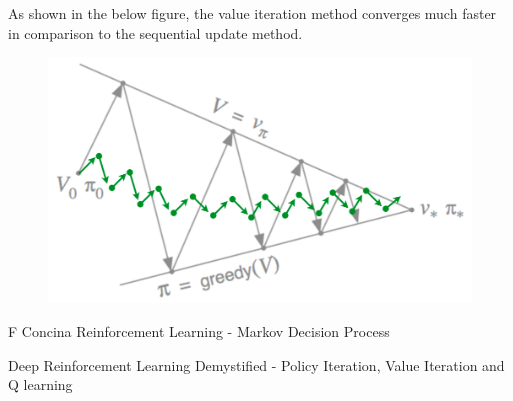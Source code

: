 \documentclass[11pt]{article}
\begin{document}
As shown in the below figure, the value iteration method converges much faster in comparison to the sequential update method.
\begin{figure}[H]
    \centering
    \includegraphics[scale=0.4]{images/value_iteration.png}
    
\end{figure}




{


\begin{thebibliography}{9}
    
    F Concina Reinforcement Learning - Markov Decision Process\\
    [\textit{[Markov Decision Process](https://fabioconcina.github.io/blog/markov-decision-process)}]
    
    Deep Reinforcement Learning Demystified - Policy Iteration, Value Iteration and Q learning\\
    [\textit{https://medium.com/@m.alzantot/deep-reinforcement-learning-demysitifed-episode-2-policy-iteration-value-iteration-and-q-978f9e89ddaa}]
\end{thebibliography}

}


\end{document}
